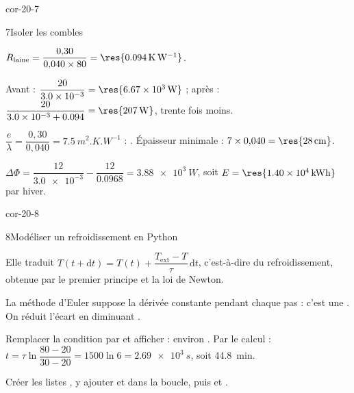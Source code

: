 \begin{blocLivre}{cor-20-7}
\begin{corrige}{7}{Isoler les combles}
\begin{questions}
\item $R_\mathrm{laine}=\dfrac{0{,}30}{0{,}040\times80}=\res{\qty{0,094}{K.W^{-1}}}$.
\item Avant : $\dfrac{20}{\num{3.0e-3}}=\res{\qty{6,67e3}{W}}$ ; après : $\dfrac{20}{\num{3.0e-3}+\num{0.094}}=\res{\qty{207}{W}}$, trente fois moins.
\item $\dfrac{e}{\lambda}=\dfrac{0{,}30}{0{,}040}=\qty{7,5}{m^2.K.W^{-1}}$ : . Épaisseur minimale :
$7\times0{,}040=\res{\qty{28}{cm}}$.
\item $\Delta\Phi=\dfrac{12}{\num{3.0e-3}}-\dfrac{12}{\num{0.0968}}=\qty{3,88e3}{W}$, soit $E=\res{\qty{1,40e4}{kWh}}$ par hiver.
\end{questions}
\end{corrige}
\end{blocLivre}
\begin{blocLivre}{cor-20-8}
\begin{corrige}{8}{Modéliser un refroidissement en Python}
\begin{questions}
\item Elle traduit $T(t+\mathrm{d}t)=T(t)+\dfrac{T_\mathrm{ext}-T}{\tau}\,\mathrm{d}t$, c'est-à-dire 
du refroidissement, obtenue par le premier principe et la loi de Newton.
\item La méthode d'Euler suppose la dérivée constante pendant chaque pas : c'est une . On réduit
l'écart en diminuant .
\item Remplacer la condition par  et afficher  : environ . Par le calcul :
$t=\tau\ln\dfrac{80-20}{30-20}=1500\ln6=\qty{2,69e3}{s}$, soit \qty{44,8}{min}.
\item Créer les listes , y ajouter  et  dans la boucle,
puis  et .
\end{questions}
\end{corrige}
\end{blocLivre}
